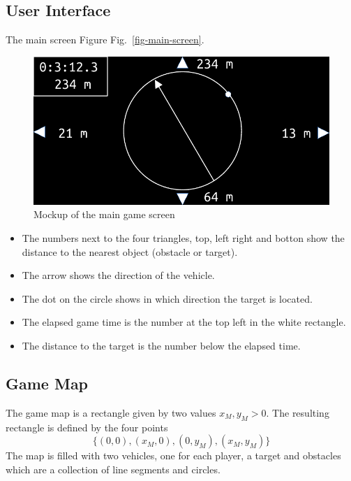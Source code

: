 \documentclass[11pt]{article}
\newcommand{\figref}[1]{Fig.~\eqref{#1}}
\begin{document}
\subsection{User Interface}
\label{sec-user-interface}
The main screen Figure \figref{fig-main-screen}.
\begin{figure}
    \includegraphics[width=\textwidth]{screen.pdf}
\caption{Mockup of the main game screen}\label{fig-main-screen}
\end{figure}
\begin{itemize}
    \item The numbers next to the four triangles, top, left right and botton
        show the distance to the nearest object (obstacle or target).
    \item The arrow shows the direction of the vehicle.
    \item The dot on the circle shows in which direction the target is
        located.
    \item The elapsed game time is the number at the top left in the white
        rectangle.
    \item The distance to the target is the number below the elapsed time.
\end{itemize}

\subsection{Game Map}
\label{sec-game-map}
The game map is a rectangle given by two values $x_M, y_M > 0$. The resulting
rectangle is defined by the four points
\begin{equation*}
    \{(0,0), (x_M, 0), (0, y_M), (x_M, y_M)\}
\end{equation*}
The map is filled with two vehicles, one for each player, a target and
obstacles which are a collection of line segments and circles.
\end{document}

